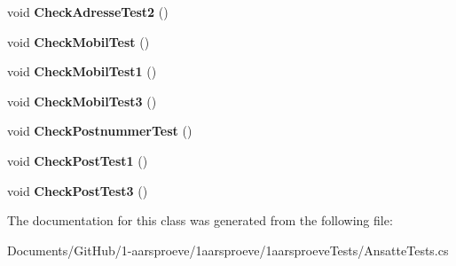 \begin{DoxyCompactItemize}
\item 
\hypertarget{class__1aarsproeve_tests_1_1_ansatte_tests_a117f78ffa10a1aa5a8cbf323226cded9}{}void {\bfseries Check\+Adresse\+Test2} ()\label{class__1aarsproeve_tests_1_1_ansatte_tests_a117f78ffa10a1aa5a8cbf323226cded9}

\item 
\hypertarget{class__1aarsproeve_tests_1_1_ansatte_tests_ab7a4369fd1c3b60be90c76683a176b7d}{}void {\bfseries Check\+Mobil\+Test} ()\label{class__1aarsproeve_tests_1_1_ansatte_tests_ab7a4369fd1c3b60be90c76683a176b7d}

\item 
\hypertarget{class__1aarsproeve_tests_1_1_ansatte_tests_a12b592d09f9d6486f20dcc772feae403}{}void {\bfseries Check\+Mobil\+Test1} ()\label{class__1aarsproeve_tests_1_1_ansatte_tests_a12b592d09f9d6486f20dcc772feae403}

\item 
\hypertarget{class__1aarsproeve_tests_1_1_ansatte_tests_a6363a57e892ba9531aeb65b5af268ee6}{}void {\bfseries Check\+Mobil\+Test3} ()\label{class__1aarsproeve_tests_1_1_ansatte_tests_a6363a57e892ba9531aeb65b5af268ee6}

\item 
\hypertarget{class__1aarsproeve_tests_1_1_ansatte_tests_a827601d9f74ac059f1e30ca38fbb5200}{}void {\bfseries Check\+Postnummer\+Test} ()\label{class__1aarsproeve_tests_1_1_ansatte_tests_a827601d9f74ac059f1e30ca38fbb5200}

\item 
\hypertarget{class__1aarsproeve_tests_1_1_ansatte_tests_a216a0fc13afc723d1fc7482da14d3ccd}{}void {\bfseries Check\+Post\+Test1} ()\label{class__1aarsproeve_tests_1_1_ansatte_tests_a216a0fc13afc723d1fc7482da14d3ccd}

\item 
\hypertarget{class__1aarsproeve_tests_1_1_ansatte_tests_a76d38b0a91fa1035532fbe186692a790}{}void {\bfseries Check\+Post\+Test3} ()\label{class__1aarsproeve_tests_1_1_ansatte_tests_a76d38b0a91fa1035532fbe186692a790}

\end{DoxyCompactItemize}


The documentation for this class was generated from the following file\+:\begin{DoxyCompactItemize}
\item 
Documents/\+Git\+Hub/1-\/aarsproeve/1aarsproeve/1aarsproeve\+Tests/Ansatte\+Tests.\+cs\end{DoxyCompactItemize}
